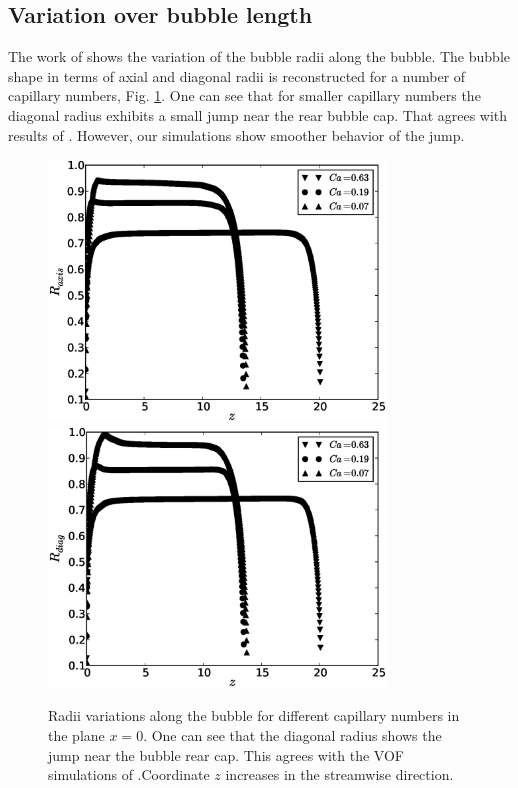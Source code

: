 \documentclass[preprint,12pt]{elsarticle}
\begin{document}
\subsection{Variation over bubble length}
The work of \citet{wang-non-circular} shows the variation of the bubble
radii along the
bubble. The bubble shape in terms of axial and diagonal radii is reconstructed for a number of
capillary numbers, Fig. \ref{fig:bubble:variation:capillaries}. One can see that for smaller
capillary numbers the diagonal radius exhibits a small jump near the rear bubble cap. That agrees
with results of \citet{wang-non-circular}. However, our simulations show smoother behavior of
the jump.  
\begin{figure}[ht]
\includegraphics[width=0.8\textwidth]{bubble_rad_axis.eps}\\
\includegraphics[width=0.8\textwidth]{bubble_rad_diag.eps}\\
\caption{Radii variations along the bubble for different capillary numbers in the plane $x=0$.
One can see that the diagonal radius shows the jump near the bubble rear cap. This agrees with the
VOF simulations of \citet{wang-non-circular}.Coordinate $z$ increases in the streamwise direction.
\label{fig:bubble:variation:capillaries}}
\end{figure}
\end{document}
